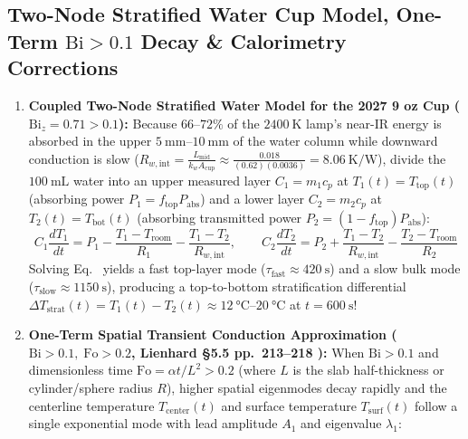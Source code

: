 \subsection{Two-Node Stratified Water Cup Model, One-Term $\mathrm{Bi} > 0.1$ Decay \& Calorimetry Corrections}
\begin{enumerate}
  \item \textbf{Coupled Two-Node Stratified Water Model for the 2027 9 oz Cup ($\mathrm{Bi}_z = 0.71 > 0.1$):}
  Because $66\text{--}72\%$ of the $\SI{2400}{\kelvin}$ lamp's near-IR energy is absorbed in the upper $\SIrange{5}{10}{\milli\meter}$ of the water column while downward conduction is slow ($R_{w,\mathrm{int}} = \frac{L_{\mathrm{mid}}}{k_w A_{\mathrm{cup}}} \approx \frac{0.018}{(0.62)(0.0036)} = \SI{8.06}{\kelvin\per\watt}$), divide the $\SI{100}{\milli\liter}$ water into an upper measured layer $C_1 = m_1 c_p$ at $T_1(t) = T_{\mathrm{top}}(t)$ (absorbing power $P_1 = f_{\mathrm{top}}P_{\mathrm{abs}}$) and a lower layer $C_2 = m_2 c_p$ at $T_2(t) = T_{\mathrm{bot}}(t)$ (absorbing transmitted power $P_2 = (1 - f_{\mathrm{top}})P_{\mathrm{abs}}$):
  \begin{equation}
    C_1\frac{dT_1}{dt} = P_1 - \frac{T_1 - T_{\mathrm{room}}}{R_1} - \frac{T_1 - T_2}{R_{w,\mathrm{int}}}, \qquad
    C_2\frac{dT_2}{dt} = P_2 + \frac{T_1 - T_2}{R_{w,\mathrm{int}}} - \frac{T_2 - T_{\mathrm{room}}}{R_2}
    \label{eq:13:two-node-strat}
  \end{equation}
  Solving Eq.~ yields a fast top-layer mode ($\tau_{\mathrm{fast}} \approx \SI{420}{\second}$) and a slow bulk mode ($\tau_{\mathrm{slow}} \approx \SI{1150}{\second}$), producing a top-to-bottom stratification differential $\Delta T_{\mathrm{strat}}(t) = T_1(t) - T_2(t) \approx \SIrange{+12}{+20}{\celsius}$ at $t = \SI{600}{\second}$!
  \item \textbf{One-Term Spatial Transient Conduction Approximation ($\mathrm{Bi} > 0.1,\; \mathrm{Fo} > 0.2$, Lienhard §5.5 pp.~213--218 ):}
  When $\mathrm{Bi} > 0.1$ and dimensionless time $\mathrm{Fo} = \alpha t / L^2 > 0.2$ (where $L$ is the slab half-thickness or cylinder/sphere radius $R$), higher spatial eigenmodes decay rapidly and the centerline temperature $T_{\mathrm{center}}(t)$ and surface temperature $T_{\mathrm{surf}}(t)$ follow a single exponential mode with lead amplitude $A_1$ and eigenvalue $\lambda_1$:
  \begin{equation}

\end{equation}
\end{enumerate}
